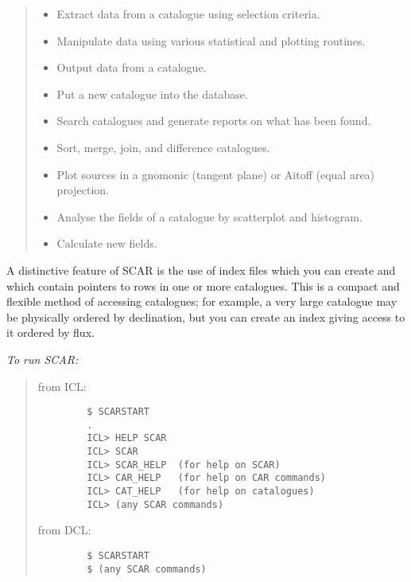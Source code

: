 {\small
\begin{quote}
\begin{itemize}
\item Extract data from a catalogue using selection criteria.
\item Manipulate data using various statistical and plotting routines.
\item Output data from a catalogue.
\item Put a new catalogue into the database.
\item Search catalogues and generate reports on what has been found.
\item Sort, merge, join, and difference catalogues.
\item Plot sources in a gnomonic (tangent plane) or Aitoff (equal area)
 projection.
\item Analyse the fields of a catalogue by scatterplot and histogram.
\item Calculate new fields.
\end{itemize}
\end{quote}
}

A distinctive feature of SCAR is the use of index files
which you can create and which contain pointers to rows in one or more
catalogues.
This is a compact and flexible method of accessing catalogues;
for example, a very large catalogue may be physically ordered by declination,
but you can create an index giving access to it ordered by flux.

{\em To run SCAR:}\hfill
\begin{quote}
\begin{description}

\item [from ICL:]\hfill

\begin{small}
\begin{verbatim}
   $ SCARSTART
   .
   ICL> HELP SCAR
   ICL> SCAR
   ICL> SCAR_HELP  (for help on SCAR)
   ICL> CAR_HELP   (for help on CAR commands)
   ICL> CAT_HELP   (for help on catalogues)
   ICL> (any SCAR commands)
\end{verbatim}
\end{small}

\item [from DCL:]\hfill

\begin{small}
\begin{verbatim}
   $ SCARSTART
   $ (any SCAR commands)
\end{verbatim}
\end{small}

\end{description}
\end{quote}

